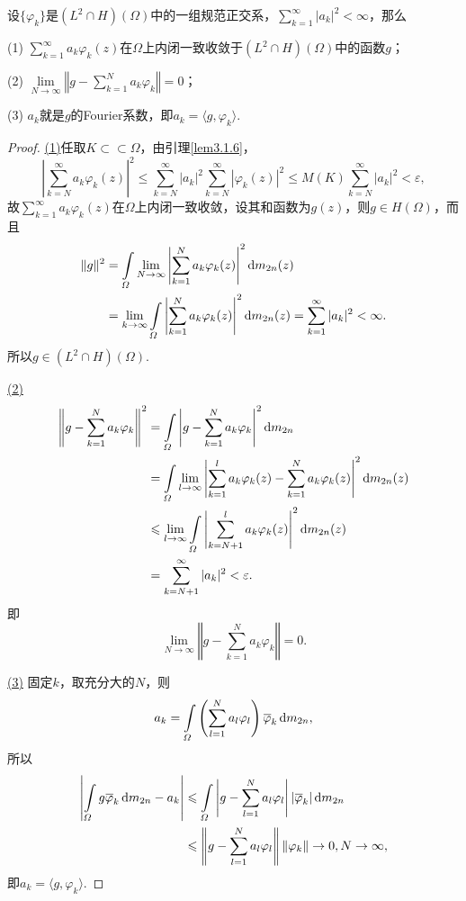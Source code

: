 \begin{theorem}\label{thm3.1.7}
	设$\{\varphi_k\}$是$(L^2\cap H)(\Omega)$中的一组规范正交系，$\sum\limits_{k=1}^\infty |a_k|^2<\infty$，那么
	
	(1)\hypertarget{3.1.7}{}
	$\sum\limits_{k=1}^\infty a_k\varphi_k(z)$在$\Omega$上内闭一致收敛于$(L^2\cap H)(\Omega)$中的函数$g$；
	
	(2)\hypertarget{3.1.7}{}
	$\lim\limits_{N\to\infty}\left\Vert g-\sum\limits_{k=1}^N a_k\varphi_k\right\Vert=0$；
	
	(3)\hypertarget{3.1.7}{}
	$a_k$就是$g$的Fourier系数，即$a_k=\langle g,\varphi_k\rangle$.
\end{theorem}
\begin{proof}
	\hyperlink{3.1.7}{(1)}任取$K\subset\subset\Omega$，由引理\ref{lem3.1.6}，
	\[\left|\sum_{k=N}^{\infty}a_k\varphi_k(z)\right|^2\le\sum_{k=N}^{\infty}|a_k|^2\sum_{k=N}^{\infty}\left|\varphi_k(z)\right|^2\le M(K)\sum_{k=N}^{\infty}|a_k|^2<\varepsilon,\]
	故$\sum\limits_{k=1}^\infty a_k\varphi_k(z)$在$\Omega$上内闭一致收敛，设其和函数为$g(z)$，则$g\in H(\Omega)$，而且
	\begin{align*}
		\Vert g\Vert^2
		&=\int\limits_\varOmega\lim_{N\to\infty}\left|\sum_{k=1}^{N}a_k\varphi_k(z)\right|^2\mathop{}\!\mathrm{d} m_{2n}(z)\\
		&=\lim_{k\to\infty}\int\limits_{\varOmega}\left|\sum_{k=1}^{N}a_k\varphi_k(z)\right|^2\mathop{}\!\mathrm{d} m_{2n}(z)=\sum_{k=1}^{\infty}|a_k|^2<\infty.
	\end{align*}
所以$g\in(L^2\cap H)(\Omega)$.

\hyperlink{3.1.7}{(2)}
\begin{align*}
	\left\Vert g-\sum_{k=1}^{N}a_k\varphi_k\right\Vert^2
	&=\int\limits_\varOmega\left|g-\sum_{k=1}^{N}a_k\varphi_k\right|^2\mathop{}\!\mathrm{d} m_{2n}\\
	&=\int\limits_\varOmega\lim_{l\to\infty}\left|\sum_{k=1}^{l}a_k\varphi_k(z)-\sum_{k=1}^{N}a_k\varphi_k(z)\right|^2\mathop{}\!\mathrm{d} m_{2n}(z)\\
	&\leqslant\lim_{l\to\infty}\int\limits_\varOmega\left|\sum_{k=N+1}^{l}a_k\varphi_k(z)\right|^2\mathop{}\!\mathrm{d} m_{2n}(z)\\
	&=\sum_{k=N+1}^{\infty}|a_k|^2<\varepsilon.
\end{align*}
即
\[\lim_{N\to\infty}\left\Vert g-\sum_{k=1}^{N}a_k\varphi_k\right\Vert=0.\]

\hyperlink{3.1.7}{(3)}
固定$k$，取充分大的$N$，则
\[a_k=\int\limits_\varOmega\left(\sum_{l=1}^{N}a_l\varphi_l\right){}\mkern1mu\overline{\mkern-1mu\varphi}_k\mathop{}\!\mathrm{d} m_{2n},\]
所以
\begin{align*}
	\left|\int\limits_\varOmega g{}\mkern1mu\overline{\mkern-1mu\varphi}_k\mathop{}\!\mathrm{d} m_{2n}-a_k\right|
	&\leqslant\int\limits_\varOmega\left|g-\sum_{l=1}^{N}a_l\varphi_l\right|\left|{}\mkern1mu\overline{\mkern-1mu\varphi}_k\right|\mathop{}\!\mathrm{d} m_{2n}\\
	&\leqslant\left\Vert g-\sum_{l=1}^{N}a_l\varphi_l\right\Vert\Vert\varphi_k\Vert\to0,N\to\infty,
\end{align*}
即$a_k=\langle g,\varphi_k\rangle$.
\end{proof}
